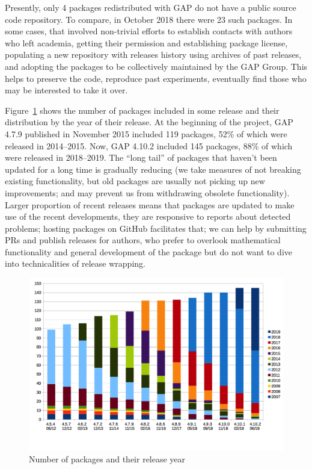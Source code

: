 \documentclass{deliverablereport}
\begin{document}
Presently, only 4 packages redistributed with GAP do not have a public 
source code repository. To compare, in October 2018 there were 23 such 
packages. In some cases, that involved non-trivial efforts to establish 
contacts with authors who left academia, getting their permission and 
establishing package license, populating a new repository with releases 
history using archives of past releases, and adopting the packages to
be collectively maintained by the GAP Group. This helps to preserve the
code, reproduce past experiments, eventually find those who may be interested
to take it over.

Figure~\ref{fig:gap-package-releases} shows the number of \GAP packages
included in some \GAP release and their distribution by the year of their
release. At the beginning of the project, GAP 4.7.9 published in November
2015 included 119 packages, 52\% of which were released in 2014--2015.
Now, GAP 4.10.2 included 145 packages, 88\% of which were released in
2018--2019. The ``long tail'' of packages that haven't been updated for
a long time is gradually reducing (we take measures of not breaking
existing functionality, but old packages are usually not picking up
new improvements; and may prevent us from withdrawing obsolete
functionality). Larger proportion of recent releases means that 
packages are updated to make use of the recent \GAP developments,
they are responsive to reports about detected problems; hosting packages on GitHub
facilitates that; we can help by submitting PRs and publish releases for authors,
who prefer to overlook mathematical functionality and general development of the
package but do not want to dive into technicalities of release wrapping.

\begin{figure}[!ht]
    \centering
    \includegraphics[width=\textwidth]{images/gap-package-releases}
    \caption{Number of \GAP packages and their release year}
    \label{fig:gap-package-releases}
\end{figure}
\end{document}

